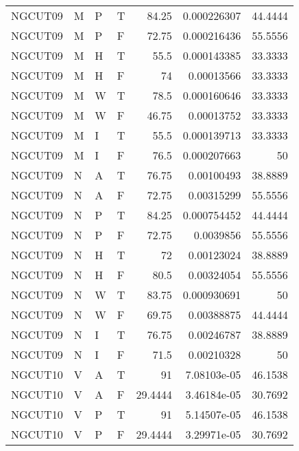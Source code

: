 \begin{longtable}{llllrrr}
    NGCUT09  & M     & P     & T          & 84.25      & 0.000226307 & 44.4444  \\
    NGCUT09  & M     & P     & F          & 72.75      & 0.000216436 & 55.5556  \\
    NGCUT09  & M     & H     & T          & 55.5       & 0.000143385 & 33.3333  \\
    NGCUT09  & M     & H     & F          & 74         & 0.00013566  & 33.3333  \\
    NGCUT09  & M     & W     & T          & 78.5       & 0.000160646 & 33.3333  \\
    NGCUT09  & M     & W     & F          & 46.75      & 0.00013752  & 33.3333  \\
    NGCUT09  & M     & I     & T          & 55.5       & 0.000139713 & 33.3333  \\
    NGCUT09  & M     & I     & F          & 76.5       & 0.000207663 & 50       \\
    NGCUT09  & N     & A     & T          & 76.75      & 0.00100493  & 38.8889  \\
    NGCUT09  & N     & A     & F          & 72.75      & 0.00315299  & 55.5556  \\
    NGCUT09  & N     & P     & T          & 84.25      & 0.000754452 & 44.4444  \\
    NGCUT09  & N     & P     & F          & 72.75      & 0.0039856   & 55.5556  \\
    NGCUT09  & N     & H     & T          & 72         & 0.00123024  & 38.8889  \\
    NGCUT09  & N     & H     & F          & 80.5       & 0.00324054  & 55.5556  \\
    NGCUT09  & N     & W     & T          & 83.75      & 0.000930691 & 50       \\
    NGCUT09  & N     & W     & F          & 69.75      & 0.00388875  & 44.4444  \\
    NGCUT09  & N     & I     & T          & 76.75      & 0.00246787  & 38.8889  \\
    NGCUT09  & N     & I     & F          & 71.5       & 0.00210328  & 50       \\
    NGCUT10  & V     & A     & T          & 91         & 7.08103e-05 & 46.1538  \\
    NGCUT10  & V     & A     & F          & 29.4444    & 3.46184e-05 & 30.7692  \\
    NGCUT10  & V     & P     & T          & 91         & 5.14507e-05 & 46.1538  \\
    NGCUT10  & V     & P     & F          & 29.4444    & 3.29971e-05 & 30.7692  \\

\end{longtable}
